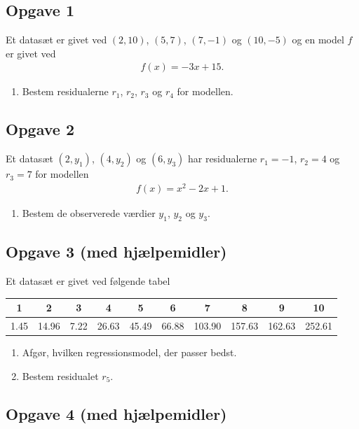 \subsection*{Opgave 1}
Et datasæt er givet ved $(2,10)$, $(5,7)$, $(7,-1)$ og $(10,-5)$ og en model $f$ er givet ved
\begin{align*}
	f(x) = -3x + 15.
\end{align*}
\begin{enumerate}[label=\roman*)]
	\item Bestem residualerne $r_1$, $r_2$, $r_3$ og $r_4$ for modellen. 
\end{enumerate}

\subsection*{Opgave 2}
Et datasæt $(2,y_1)$, $(4,y_2)$ og $(6,y_3)$ har residualerne $r_1 = -1$, $r_2 = 4$ og $r_3 = 7$ for modellen
\begin{align*}
	f(x) = x^2 -2x + 1.
\end{align*}
\begin{enumerate}[label=\roman*)]
	\item Bestem de observerede værdier $y_1$, $y_2$ og $y_3$.
\end{enumerate}



\subsection*{Opgave 3 (med hjælpemidler)}

Et datasæt er givet ved følgende tabel
\begin{center}
\begin{tabular}{c|c|c|c|c|c|c|c|c|c}
1 & 2 & 3 & 4 & 5 & 6 & 7 & 8 & 9 & 10\\ \hline
1.45 & 14.96 & 7.22 & 26.63 & 45.49 & 66.88 & 103.90&157.63 & 162.63 & 252.61
\end{tabular}
\end{center}

\begin{enumerate}[label=\roman*)]
	\item Afgør, hvilken regressionsmodel, der passer bedst.
	\item Bestem residualet $r_5$. 
\end{enumerate}

\subsection*{Opgave 4 (med hjælpemidler)}

